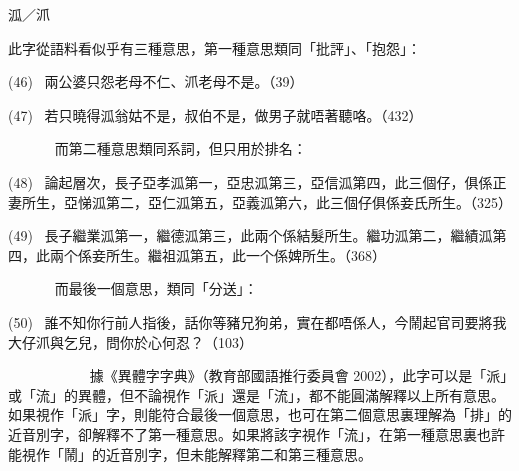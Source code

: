 泒／沠

此字從語料看似乎有三種意思，第一種意思類同「批評」、「抱怨」：

(46)  兩公婆只怨老母不仁、沠老母不是。（39）

(47)  若只曉得泒翁姑不是，叔伯不是，做男子就唔著聽咯。（432）

       而第二種意思類同系詞，但只用於排名：

(48)  論起層次，長子亞孝泒第一，亞忠泒第三，亞信泒第四，此三個仔，俱係正妻所生，亞悌泒第二，亞仁泒第五，亞義泒第六，此三個仔俱係妾氏所生。（325）

(49)  長子繼業泒第一，繼德泒第三，此兩个係結髮所生。繼功泒第二，繼績泒第四，此兩个係妾所生。繼祖泒第五，此一个係婢所生。（368）

       而最後一個意思，類同「分送」：

(50)  誰不知你行前人指後，話你等豬兄狗弟，實在都唔係人，今鬧起官司要將我大仔沠與乞兒，問你於心何忍？（103）

            據《異體字字典》（教育部國語推行委員會 2002），此字可以是「派」或「流」的異體，但不論視作「派」還是「流」，都不能圓滿解釋以上所有意思。如果視作「派」字，則能符合最後一個意思，也可在第二個意思裏理解為「排」的近音別字，卻解釋不了第一種意思。如果將該字視作「流」，在第一種意思裏也許能視作「鬧」的近音別字，但未能解釋第二和第三種意思。
